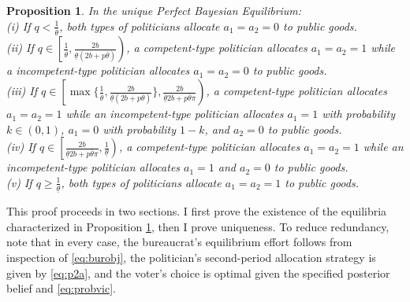 \documentclass[11pt,english]{article}
\newtheorem{prop}{Proposition}
\begin{document}
\begin{prop}\label{propa1} In the unique Perfect Bayesian Equilibrium:\\

(i) If $q < \frac{1}{\overline{\theta}}$, both types of politicians allocate $a_1 = a_2 = 0$ to public goods.  \\

(ii) If $q \in \left[\frac{1}{\overline{\theta}}, \frac{2b}{\underline{\theta}(2b + p\overline{\theta})}\right)$, a competent-type politician allocates $a_1 = a_2 = 1$ while a incompetent-type politician allocates $a_1 = a_2 = 0$ to public goods. \\

(iii) If $q \in \left[\max\{\frac{1}{\overline{\theta}},\frac{2b}{\underline{\theta}(2b + p\overline{\theta})}\}, \frac{2b}{\underline{\theta}2b + p\overline{\theta}\pi}\right)$, a competent-type politician allocates $a_1=a_2 = 1$ while an incompetent-type politician allocates $a_1 = 1$ with probability $k \in (0,1)$, $a_1 = 0$ with probability $1-k$, and $a_2 = 0$ to public goods. \\

(iv) If $q \in \left[\frac{2b}{\underline{\theta}2b + p\overline{\theta}\pi}, \frac{1}{\underline{\theta}}\right)$, a competent-type politician allocates $a_1 = a_2 = 1$ while an incompetent-type politician allocates $a_1 = 1$ and $a_2 = 0$ to public goods. \\

(v) If $q \geq \frac{1}{\underline{\theta}}$, both types of politicians allocate $a_1 = a_2 = 1$ to public goods. 
\end{prop}


This proof proceeds in two sections. I first prove the existence of the equilibria characterized in Proposition \ref{propa1}, then I prove uniqueness. To reduce redundancy, note that in every case, the bureaucrat's equilibrium effort follows from inspection of \eqref{eq:burobj}, the politician's second-period allocation strategy is given by \eqref{eq:p2a}, and the voter's choice is optimal given the specified posterior belief and \eqref{eq:probvic}. \\
\end{document}
